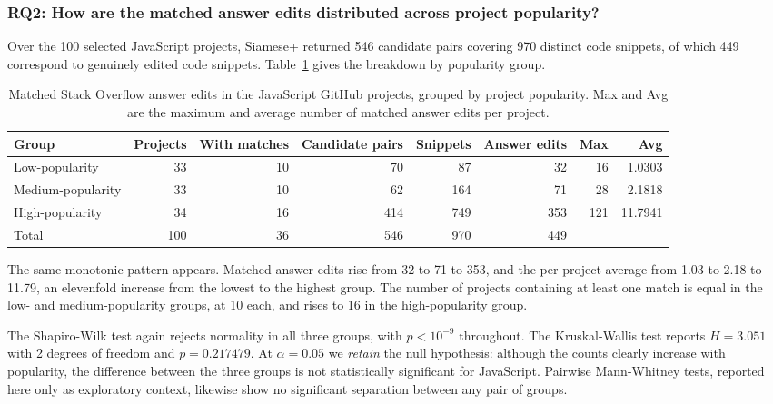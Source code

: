 \documentclass[onecolumn,11pt]{IEEEtran}
\begin{document}
\subsubsection{RQ2: How are the matched answer edits distributed across project
popularity?}

Over the 100 selected JavaScript projects, Siamese+ returned 546 candidate pairs covering 970 distinct code snippets, of which 449 correspond to genuinely edited code snippets.
Table~\ref{tab:rq2-javascript} gives the breakdown by popularity group.

\begin{table}[!t]
\caption{Matched Stack Overflow answer edits in the JavaScript GitHub projects, grouped by
project popularity.
Max and Avg are the maximum and average number of matched answer edits per project.}
\label{tab:rq2-javascript}
\centering
\begin{tabular}{lrrrrrrr}
\toprule
Group & Projects & With matches & Candidate pairs & Snippets & Answer edits & Max & Avg \\
\midrule
Low-popularity    & 33 & 10 &  70 &  87 &  32 &  16 &  1.0303 \\
Medium-popularity & 33 & 10 &  62 & 164 &  71 &  28 &  2.1818 \\
High-popularity   & 34 & 16 & 414 & 749 & 353 & 121 & 11.7941 \\
\midrule
Total & 100 & 36 & 546 & 970 & 449 & & \\
\bottomrule
\end{tabular}
\end{table}

The same monotonic pattern appears.
Matched answer edits rise from 32 to 71 to 353, and the per-project average from 1.03 to 2.18 to 11.79, an elevenfold increase from the lowest to the highest group.
The number of projects containing at least one match is equal in the low- and medium-popularity groups, at 10 each, and rises to 16 in the high-popularity group.

The Shapiro-Wilk test again rejects normality in all three groups, with $p < 10^{-9}$ throughout.
The Kruskal-Wallis test reports $H = 3.051$ with 2 degrees of freedom and $p = 0.217479$.
At $\alpha = 0.05$ we \emph{retain} the null hypothesis: although the counts clearly increase with popularity, the difference between the three groups is not statistically significant for JavaScript.
Pairwise Mann-Whitney tests, reported here only as exploratory context, likewise show no significant separation between any pair of groups.
\end{document}
